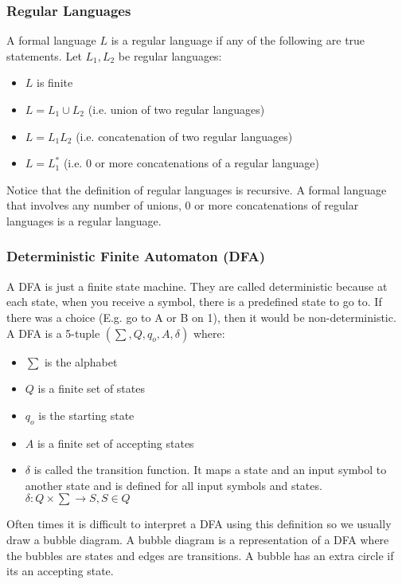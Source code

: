 \documentclass[12pt, letterpaper]{article}
\begin{document}
\subsubsection{Regular Languages}
A formal language \(L\) is a regular language if any of the following are true statements. Let \(L_1, L_2\) be regular languages:

\begin{itemize}
\item \(L\) is finite
\item \(L = L_1 \cup L_2\) (i.e. union of two regular languages)
\item \(L = L_1L_2\) (i.e. concatenation of two regular languages)
\item \(L = L_1^*\) (i.e. 0 or more concatenations of a regular language)
\end{itemize}

Notice that the definition of regular languages is recursive. A formal language that involves any number of unions, 0 or more concatenations of regular languages is a regular language.

\subsubsection{Deterministic Finite Automaton (DFA)}
A DFA is just a finite state machine. They are called deterministic because at each state, when you receive a symbol, there is a predefined state to go to. If there was a choice (E.g. go to A or B on 1), then it would be non-deterministic.\\

A DFA is a 5-tuple \((\sum, Q, q_o, A, \delta)\) where:

\begin{itemize}
\item \(\sum\) is the alphabet
\item \(Q\) is a finite set of states
\item \(q_o\) is the starting state
\item \(A\) is a finite set of accepting states
\item \(\delta\) is called the transition function. It maps a state and an input symbol to another state and is defined for all input symbols and states. \(\delta: Q \times \sum \rightarrow S, S \in Q\)
\end{itemize}

Often times it is difficult to interpret a DFA using this definition so we usually draw a bubble diagram. A bubble diagram is a representation of a DFA where the bubbles are states and edges are transitions. A bubble has an extra circle if its an accepting state.\\
\end{document}

